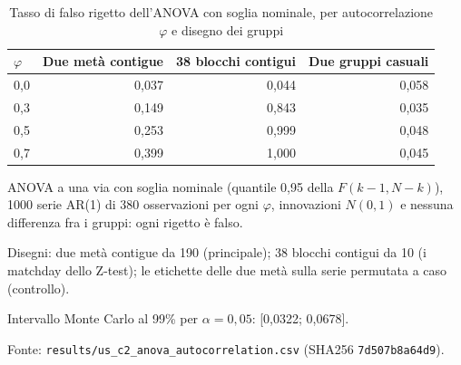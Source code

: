 \begin{table}[htbp]
\centering
\small
\caption{Tasso di falso rigetto dell'ANOVA con soglia nominale, per autocorrelazione $\varphi$ e disegno dei gruppi}
\label{tab:falso_rigetto}
\begin{tabular}{lrrr}
\toprule
$\varphi$ & Due metà contigue & 38 blocchi contigui & Due gruppi casuali \\
\midrule
0,0 & 0,037 & 0,044 & 0,058 \\
0,3 & 0,149 & 0,843 & 0,035 \\
0,5 & 0,253 & 0,999 & 0,048 \\
0,7 & 0,399 & 1,000 & 0,045 \\
\bottomrule
\end{tabular}

\smallskip
\begin{minipage}{\linewidth}
\footnotesize
ANOVA a una via con soglia nominale (quantile 0,95 della $F(k - 1, N - k)$), 1000 serie AR(1) di 380 osservazioni per ogni $\varphi$, innovazioni $N(0, 1)$ e nessuna differenza fra i gruppi: ogni rigetto è falso.\par
Disegni: due metà contigue da 190 (principale); 38 blocchi contigui da 10 (i matchday dello Z-test); le etichette delle due metà sulla serie permutata a caso (controllo).\par
Intervallo Monte Carlo al 99\% per $\alpha = 0{,}05$: [0,0322; 0,0678].\par
Fonte: \texttt{results/us\_c2\_anova\_autocorrelation.csv} (SHA256 \texttt{7d507b8a64d9}).
\end{minipage}
\end{table}
